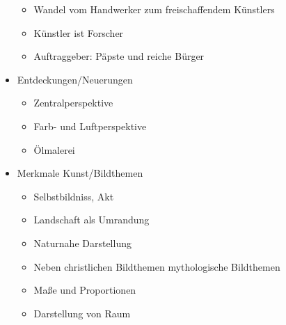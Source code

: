 \begin{itemize}
	\begin{itemize}
		\item Wandel vom Handwerker zum freischaffendem Künstlers
		\item Künstler ist Forscher
		\item Auftraggeber: Päpste und reiche Bürger
	\end{itemize}
	\item Entdeckungen/Neuerungen
	\begin{itemize}
		\item Zentralperspektive
		\item Farb- und Luftperspektive
		\item Ölmalerei
	\end{itemize}
	\item Merkmale Kunst/Bildthemen
	\begin{itemize}
		\item Selbstbildniss, Akt
		\item Landschaft als Umrandung
		\item Naturnahe Darstellung
		\item Neben christlichen Bildthemen mythologische Bildthemen
		\item Maße und Proportionen
		\item Darstellung von Raum
	\end{itemize}
\end{itemize}